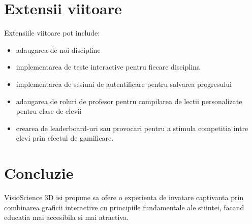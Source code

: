 \documentclass[a4paper,12pt]{article}
\begin{document}
\section*{Extensii viitoare}
Extensiile viitoare pot include:
\begin{itemize}
    \item adaugarea de noi discipline
    \item implementarea de teste interactive pentru fiecare disciplina
    \item implementarea de sesiuni de autentificare pentru salvarea progresului
    \item adaugarea de roluri de profesor pentru compilarea de lectii personalizate pentru clase de elevii
    \item crearea de leaderboard-uri sau provocari pentru a stimula competitia intre elevi prin efectul de gamificare.
\end{itemize}

\section*{Concluzie}
VisioScience 3D isi propune sa ofere o experienta de invatare captivanta prin combinarea 
graficii interactive cu principiile fundamentale ale stiintei, facand educatia mai accesibila si mai atractiva.
\end{document}
